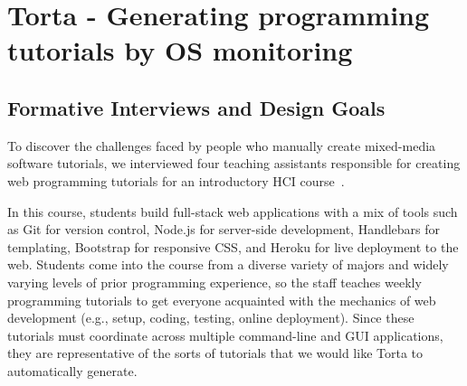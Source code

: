 \chapter{Torta - Generating programming tutorials by OS monitoring}

\section{Formative Interviews and Design Goals}


%
%
%

To discover the challenges faced by people who manually create
mixed-media software tutorials, we interviewed four teaching
assistants responsible for creating web programming tutorials for an
introductory HCI course~\cite{ixd}.


In this course, students build full-stack web applications with a mix of
tools such as Git for version control, Node.js for server-side
development, Handlebars for templating, Bootstrap for responsive CSS,
and Heroku for live deployment to the web. Students come into the course
from a diverse variety of majors and widely varying levels of prior programming
experience, so the staff teaches weekly programming tutorials to get
everyone acquainted with the mechanics of web development (e.g., setup,
coding, testing, online deployment). Since these tutorials must
coordinate across multiple command-line and GUI applications, they are
representative of the sorts of tutorials that we would like Torta to
automatically generate.


